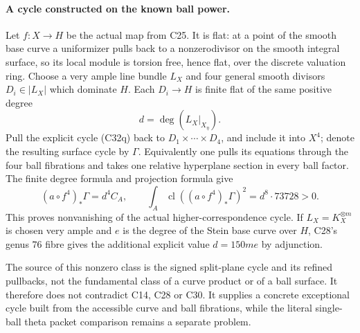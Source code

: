 \paragraph{A cycle constructed on the known ball power.}
Let $f:X\to H$ be the actual map from
C25.  It is flat: at a point of the
smooth base curve a uniformizer pulls
back to a nonzerodivisor on the smooth
integral surface, so its local module
is torsion free, hence flat, over the
discrete valuation ring.  Choose a very
ample line bundle $L_X$ and four general
smooth divisors $D_i\in|L_X|$ which
dominate $H$.  Each $D_i\to H$ is finite
flat of the same positive degree
\[
                       d=\deg(L_X|_{X_\eta}).
\]
Pull the explicit cycle (C32q) back to
$D_1\times\cdots\times D_4$, and include
it into $X^4$; denote the resulting
surface cycle by $\Gamma$.  Equivalently
one pulls its equations through the four
ball fibrations and takes one relative
hyperplane section in every ball factor.
The finite degree formula and projection
formula give
\[
       (a\circ f^4)_*\Gamma=d^4 C_A,
 \qquad
       \int_A\operatorname{cl}((a\circ f^4)_*\Gamma)^2
                                      =d^8\cdot73728>0.
                                                        \tag{C32t}
\]
This proves nonvanishing of the actual
higher-correspondence cycle.  If
$L_X=K_X^{\otimes m}$ is chosen very
ample and $e$ is the degree of the
Stein base curve over $H$, C28's genus
$76$ fibre gives the additional explicit
value $d=150me$ by adjunction.

The source of this nonzero class is the
signed split-plane cycle and its refined
pullbacks, not the fundamental class of
a curve product or of a ball surface.
It therefore does not contradict C14,
C28 or C30.  It supplies a concrete
exceptional cycle built from the
accessible curve and ball fibrations,
while the literal single-ball theta
packet comparison remains a separate
problem.


